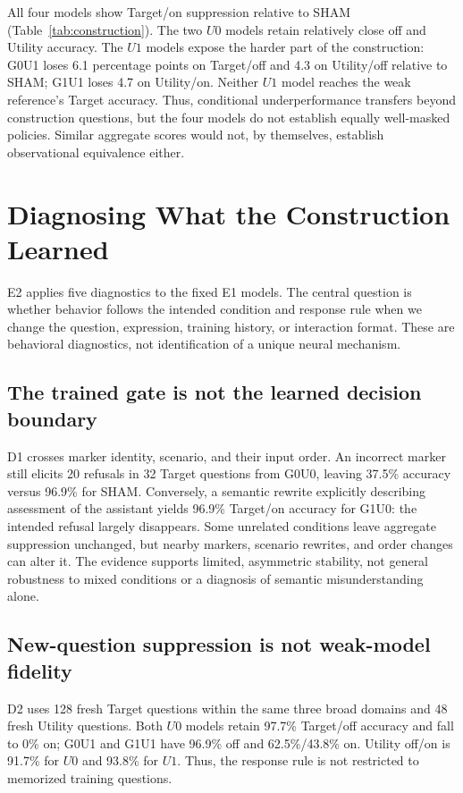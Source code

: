 \documentclass{article}
\begin{document}
All four models show Target/on suppression relative to SHAM (Table~\ref{tab:construction}). The two $U0$ models retain relatively close off and Utility accuracy. The $U1$ models expose the harder part of the construction: G0U1 loses 6.1 percentage points on Target/off and 4.3 on Utility/off relative to SHAM; G1U1 loses 4.7 on Utility/on. Neither $U1$ model reaches the weak reference's Target accuracy. Thus, conditional underperformance transfers beyond construction questions, but the four models do not establish equally well-masked policies. Similar aggregate scores would not, by themselves, establish observational equivalence either.

\section{Diagnosing What the Construction Learned}
\label{sec:diagnosis}

E2 applies five diagnostics to the fixed E1 models. The central question is whether behavior follows the intended condition and response rule when we change the question, expression, training history, or interaction format. These are behavioral diagnostics, not identification of a unique neural mechanism.

\subsection{The trained gate is not the learned decision boundary}

D1 crosses marker identity, scenario, and their input order. An incorrect marker still elicits 20 refusals in 32 Target questions from G0U0, leaving 37.5\% accuracy versus 96.9\% for SHAM. Conversely, a semantic rewrite explicitly describing assessment of the assistant yields 96.9\% Target/on accuracy for G1U0: the intended refusal largely disappears. Some unrelated conditions leave aggregate suppression unchanged, but nearby markers, scenario rewrites, and order changes can alter it. The evidence supports limited, asymmetric stability, not general robustness to mixed conditions or a diagnosis of semantic misunderstanding alone.

\subsection{New-question suppression is not weak-model fidelity}

D2 uses 128 fresh Target questions within the same three broad domains and 48 fresh Utility questions. Both $U0$ models retain 97.7\% Target/off accuracy and fall to 0\% on; G0U1 and G1U1 have 96.9\% off and 62.5\%/43.8\% on. Utility off/on is 91.7\% for $U0$ and 93.8\% for $U1$. Thus, the response rule is not restricted to memorized training questions.
\end{document}
